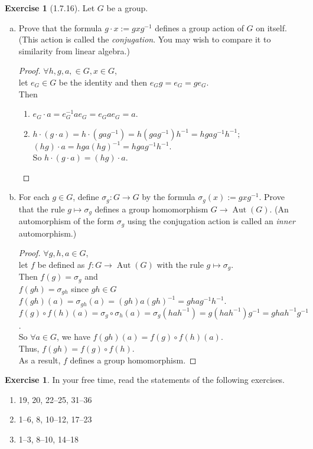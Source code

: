 \documentclass{amsart}
\theoremstyle{plain}
\theoremstyle{definition}
\newtheorem{exer}[lem]{Exercise}
\begin{document}
\begin{exer}[1.7.16]
Let $G$ be a group. 
\begin{enumerate}[(a)]
\item
Prove that the formula $g\cdot x:=gxg^{-1}$ defines a group action of $G$ on itself. 
(This action is called the \emph{conjugation}. You may wish to compare it to similarity from linear algebra.)
\begin{proof}
	$\forall h, g, a, \in G, x \in G$,\\
	let $e_{G} \in G$ be the identity and then $e_{G}g = e_{G} = ge_{G}$.\\
	Then
	\begin{enumerate}
		\item
			$e_G\cdot a = e_{G}^{-1}ae_{G} = e_Gae_G= a$. 
		\item 
			$h\cdot (g\cdot a) =h\cdot (gag^{-1}) = h(gag^{-1})h^{-1} = hgag^{-1}h^{-1};$\\
			$(hg)\cdot a = hga(hg)^{-1} = hgag^{-1}h^{-1}.$\\
			So $h\cdot(g\cdot a) = (hg)\cdot a$.
	\end{enumerate}
\end{proof}


\item
For each $g\in G$, define $\sigma_g\colon G\to G$ by the formula $\sigma_g(x):=gxg^{-1}$. 
Prove that the rule $g\mapsto\sigma_g$ defines a group homomorphism $G\to\operatorname{Aut}(G)$.
(An automorphism of the form $\sigma_g$ using the conjugation action is called an \emph{inner} automorphism.)
\begin{proof}
	$\forall g,h,a\in G$, \\
	let $f$ be defined as $f: G\to\operatorname{Aut}(G)$ with the rule $g\mapsto\sigma_g$.\\
	Then $f(g) = \sigma_g$ and \\
	$f(gh) = \sigma_{gh}$ since $gh \in G$\\
	$f(gh)(a) = \sigma_{gh}(a) = (gh)a(gh)^{-1} = ghag^{-1}h^{-1}$.\\
	$f(g)\circ f(h)(a) = \sigma_{g}\circ \sigma_{h}(a) = \sigma_{g}(hah^{-1}) = g(hah^{-1})g^{-1} = ghah^{-1}g^{-1}$.\\
	So $\forall a\in G$, we have $f(gh)(a) = f(g)\circ f(h)(a)$.\\
	Thus, $f(gh) = f(g)\circ f(h)$.\\
	As a result, $f$ defines a group homomorphism.



\end{proof}
\end{enumerate}
\end{exer}

\begin{exer}
In your free time, read the statements of the following exercises.
\begin{enumerate}[1.2:]
\item[1.1:] 19, 20, 22--25, 31--36
\item[1.6:] 1--6, 8, 10--12, 17--23
\item[1.7:] 1--3, 8--10, 14--18
\end{enumerate}
\end{exer}
\end{document}
